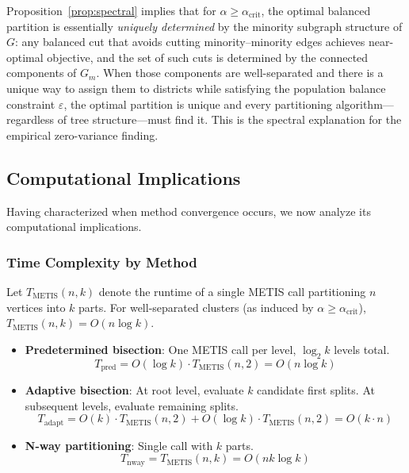\begin{remark}
\label{rem:uniqueness}
Proposition~\ref{prop:spectral} implies that for $\alpha \geq \alpha_{\text{crit}}$, the optimal balanced partition is essentially \emph{uniquely determined} by the minority subgraph structure of $G$: any balanced cut that avoids cutting minority--minority edges achieves near-optimal objective, and the set of such cuts is determined by the connected components of $G_m$. When those components are well-separated and there is a unique way to assign them to districts while satisfying the population balance constraint $\varepsilon$, the optimal partition is unique and every partitioning algorithm---regardless of tree structure---must find it. This is the spectral explanation for the empirical zero-variance finding.
\end{remark}

\subsection{Computational Implications}

Having characterized when method convergence occurs, we now analyze its computational implications.

\subsubsection{Time Complexity by Method}

Let $T_{\text{METIS}}(n, k)$ denote the runtime of a single METIS call partitioning $n$ vertices into $k$ parts. For well-separated clusters (as induced by $\alpha \geq \alpha_{\text{crit}}$), $T_{\text{METIS}}(n, k) = O(n \log k)$.

\begin{itemize}
    \item \textbf{Predetermined bisection}: One METIS call per level, $\log_2 k$ levels total.
    \[
    T_{\text{pred}} = O(\log k) \cdot T_{\text{METIS}}(n, 2) = O(n \log k)
    \]

    \item \textbf{Adaptive bisection}: At root level, evaluate $k$ candidate first splits. At subsequent levels, evaluate remaining splits.
    \[
    T_{\text{adapt}} = O(k) \cdot T_{\text{METIS}}(n, 2) + O(\log k) \cdot T_{\text{METIS}}(n, 2) = O(k \cdot n)
    \]

    \item \textbf{N-way partitioning}: Single call with $k$ parts.
    \[
    T_{\text{nway}} = T_{\text{METIS}}(n, k) = O(n k \log k)
    \]
\end{itemize}

